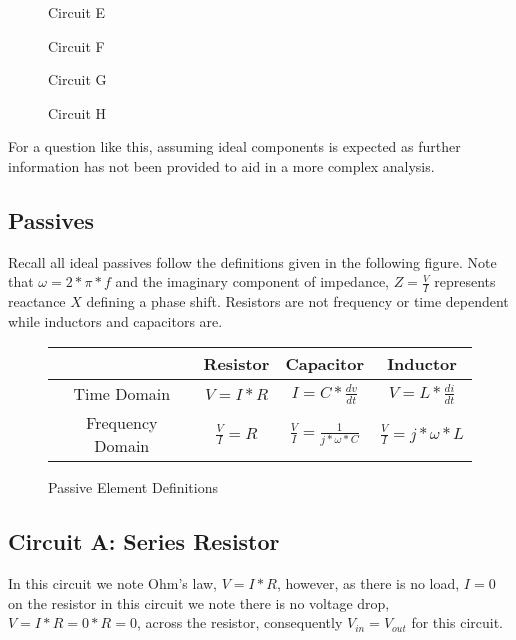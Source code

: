 \documentclass[main.tex]{subfiles}
\begin{document}
\begin{figure}[h!]
    \caption{Circuit E}
    \label{fig:c_current_source}
\end{figure}

\begin{figure}[h!]
    \caption{Circuit F}
    \label{fig:rc_current_source}
\end{figure}

\begin{figure}[h!]
    \caption{Circuit G}
    \label{fig:rlc_series}
\end{figure}

\begin{figure}[h!]
    \caption{Circuit H}
    \label{fig:rlc_parallel}
\end{figure}

\spoilerline

\noindent For a question like this, assuming ideal components is expected as further information has not been provided to aid in a more complex analysis.

\subsection{Passives}
Recall all ideal passives follow the definitions given in the following figure. Note that $\omega = 2 * \pi * f$ and the imaginary component of impedance, $Z = \frac{V}{I}$ represents reactance $X$ defining a phase shift. Resistors are not frequency or time dependent while inductors and capacitors are. 
\begin{figure}[h!]
    \centering
    \begin{tabular}{|c|c|c|c|}
        \hline
         & Resistor & Capacitor & Inductor \\ \hline
        Time Domain & $V = I * R$ & $I = C * \frac{dv}{dt}$ & $V = L * \frac{di}{dt}$ \\ \hline
        Frequency Domain & $\frac{V}{I} = R$ & $\frac{V}{I} = \frac{1}{j*\omega*C}$ & $\frac{V}{I} = j*\omega*L$ \\ \hline
    \end{tabular}
    \caption{Passive Element Definitions}
    \label{fig:passive definitions}
\end{figure}

\subsection{Circuit A: Series Resistor}
In this circuit we note Ohm's law, $V = I * R$, however, as there is no load, $I=0$ on the resistor in this circuit we note there is no voltage drop, $V=I*R=0*R=0$, across the resistor, consequently $V_{in} = V_{out}$ for this circuit. 
\end{document}
